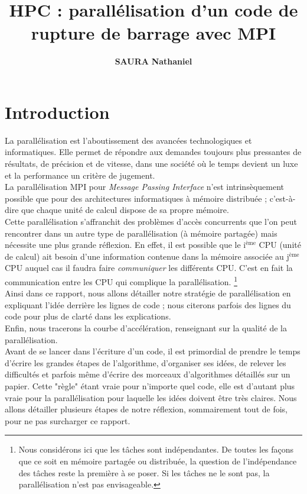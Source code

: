 \documentclass[french]{article}
\renewcommand{\headrulewidth}{1pt} %
\newcommand{\navy}{\color{navy}}
\newcommand{\bk}{\color{black}}
\newcommand{\cad}{c'est-à-dire}
\newcommand{\iieme}{i$^{\text{ème}}$}
\newcommand{\jeme}{j$^{\text{ème}}$}
\renewcommand{\headrulewidth}{1pt}
\begin{document}
\author{\navy \textbf{SAURA} \bk \textbf{Nathaniel}}
\title{\navy \textbf{HPC} : \bk parallélisation d'un code de rupture de barrage avec MPI}

\date{}
\maketitle

\thispagestyle{fancy}
\navy
\section*{Introduction} \bk
\noindent La parallélisation est l'aboutissement des avancées technologiques et informatiques. Elle permet de répondre aux demandes toujours plus pressantes de résultats, de précision et de vitesse, dans une société où le temps devient un luxe  et la performance un critère de jugement.\\
  La parallélisation MPI pour \textit{Message Passing Interface} n'est intrinsèquement possible que pour des architectures informatiques à mémoire distribuée ; \cad $ $ que chaque unité de calcul dispose de sa propre mémoire.\\
  Cette parallélisation s'affranchit des problèmes d'accès concurrents que l'on peut rencontrer dans un autre type de parallélisation (à mémoire partagée) mais nécessite une plus grande réflexion. En effet, il est possible que le \iieme $ $ CPU (unité de calcul) ait besoin d'une information contenue dans la mémoire associée au \jeme $ $ CPU auquel cas il faudra faire \textit{communiquer} les différents CPU. C'est en fait la communication entre les CPU qui complique la parallélisation. \footnote{Nous considérons ici que les tâches sont indépendantes. De toutes les façons que ce soit en mémoire partagée ou distribuée, la question de l'indépendance des tâches reste la première à se poser. Si les tâches ne le sont pas, la parallélisation n'est pas envisageable.}  \\
  Ainsi dans ce rapport, nous allons détailler notre stratégie de parallélisation en expliquant l'idée derrière les lignes de code ; nous citerons parfois des lignes du code pour plus de clarté dans les explications.\\
  Enfin, nous tracerons la courbe d'accélération, renseignant sur la qualité de la parallélisation.\\

\noindent Avant de se lancer dans l'écriture d'un code, il est primordial de prendre le temps d'écrire les grandes étapes de l'algorithme, d'organiser ses idées, de relever les difficultés et parfois même d'écrire des morceaux d'algorithmes détaillés sur un papier. Cette "règle" étant vraie pour n'importe quel code, elle est d'autant plus vraie pour la parallélisation pour laquelle les idées doivent être très claires. Nous allons détailler plusieurs étapes de notre réflexion, sommairement tout de fois, pour ne pas surcharger ce rapport.
    
\end{document}
